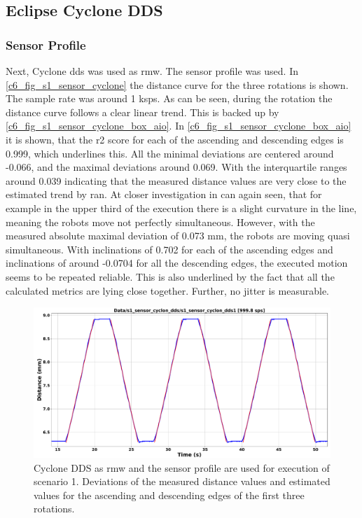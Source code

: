 \subsection{Eclipse Cyclone DDS}
\subsubsection{Sensor Profile}
Next, Cyclone \gls{dds} was used as \gls{rmw}. The sensor profile was used. In \autoref{c6_fig_s1_sensor_cyclone} the distance curve for the three rotations is shown. The sample rate was around 1 ksps. As can be seen, during the rotation the distance curve follows a clear linear trend. This is backed up by \autoref{c6_fig_s1_sensor_cyclone_box_aio}. In \autoref{c6_fig_s1_sensor_cyclone_box_aio} it is shown, that the \gls{r2} score for each of the ascending and descending edges is 0.999, which underlines this. All the minimal deviations are centered around -0.066, and the maximal deviations around 0.069. With the interquartile ranges around 0.039 indicating that the measured distance values are very close to the estimated trend by \gls{ran}. At closer investigation in can again seen, that for example in the upper third of the execution there is a slight curvature in the line, meaning the robots move not perfectly simultaneous. However, with the measured absolute maximal deviation of 0.073 \si{\milli\meter}, the robots are moving quasi simultaneous.\newline
With inclinations of 0.702 for each of the ascending edges and inclinations of around -0.0704 for all the descending edges, the executed motion seems to be repeated reliable. This is also underlined by the fact that all the calculated metrics are lying close together. Further, no jitter is measurable. 
\begin{figure}[H]
	\centering
	\includegraphics[width=1\textwidth]{Figures/c6/s1/s1_sensor_cyclon_dds.pdf}
	\caption{Cyclone DDS as \gls{rmw} and the sensor profile are used for execution of scenario 1. Deviations of the measured distance values and estimated values for the ascending and descending edges of the first three rotations.}
	\label{c6_fig_s1_sensor_cyclone}
\end{figure}
